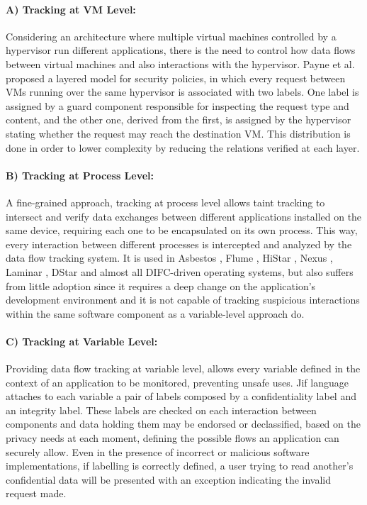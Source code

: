 \paragraph{A) Tracking at VM Level:}
Considering an architecture where multiple virtual machines controlled by a hypervisor run different applications, there is the need to control how data flows between virtual machines and also interactions with the hypervisor. Payne et al. \cite{payne} proposed a layered model for security policies, in which every request between VMs running over the same hypervisor is associated with two labels. One label is assigned by a guard component responsible for inspecting the request type and content, and the other one, derived from the first, is assigned by the hypervisor stating whether the request may reach the destination VM. This distribution is done in order to lower complexity by reducing the relations verified at each layer.

\paragraph{B) Tracking at Process Level:}
A fine-grained approach, tracking at process level allows taint tracking to intersect and verify data exchanges between different applications installed on the same device, requiring each one to be encapsulated on its own process. This way, every interaction between different processes is intercepted and analyzed by the data flow tracking system. It is used in Asbestos \cite{asbestos}, Flume \cite{flume}, HiStar \cite{histar}, Nexus \cite{nexus}, Laminar \cite{laminar}, DStar \cite{dstar} and almost all DIFC-driven operating systems, but also suffers from little adoption since it requires a deep change on the application's development environment and it is not capable of tracking suspicious interactions within the same software component as a variable-level approach do.

\paragraph{C) Tracking at Variable Level:}
Providing data flow tracking at variable level, allows every variable defined in the context of an application to be monitored, preventing unsafe uses. Jif \cite{jif} language attaches to each variable a pair of labels composed by a confidentiality label and an integrity label. These labels are checked on each interaction between components and data holding them may be endorsed or declassified, based on the privacy needs at each moment, defining the possible flows an application can securely allow. Even in the presence of incorrect or malicious software implementations, if labelling is correctly defined, a user trying to read another's confidential data will be presented with an exception indicating the invalid request made.

